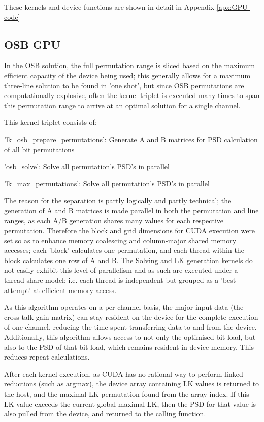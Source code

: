These kernels and device functions are shown in detail in Appendix \ref{apx:GPU-code}

\subsection{OSB GPU}
In the OSB solution, the full permutation range is sliced based on the maximum efficient capacity of the device being used; this generally allows for a maximum three-line solution to be found in 'one shot', but since OSB permutations are computationally explosive, often the kernel triplet is executed many times to span this permutation range to arrive at an optimal solution for a single channel.

This kernel triplet consists of:
\begin{itemize*}
\item{'lk\_osb\_prepare\_permutations': Generate A and B matrices for PSD calculation of all bit permutations}
\item{'osb\_solve': Solve all permutation's PSD's in parallel}
\item{'lk\_max\_permutations': Solve all permutation's PSD's in parallel}
\end{itemize*}
The reason for the separation is partly logically and partly technical; the generation of A and B matrices is made parallel in both the permutation and line ranges, as each A/B generation shares many values for each respective permutation. Therefore the block and grid dimensions for CUDA execution were set so as to enhance memory coalescing and column-major shared memory accesses; each 'block' calculates one permutation, and each thread within the block calculates one row of A and B. The Solving and LK generation kernels do not easily exhibit this level of parallelism and as such are executed under a thread-share model; i.e. each thread is independent but grouped as a 'best attempt' at efficient memory access.

As this algorithm operates on a per-channel basis, the major input data (the cross-talk gain matrix) can stay resident on the device for the complete execution of one channel, reducing the time spent transferring data to and from the device. Additionally, this algorithm allows access to not only the optimised bit-load, but also to the PSD of that bit-load, which remains resident in device memory. This reduces repeat-calculations.

After each kernel execution, as CUDA has no rational way to perform linked-reductions (such as \(\text{argmax}\)), the device array containing LK values is returned to the host, and the maximal LK-permutation found from the array-index. If this LK value exceeds the current global maximal LK, then the PSD for that value is also pulled from the device, and returned to the calling function.

